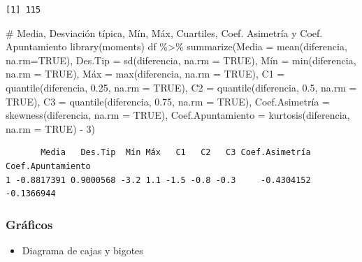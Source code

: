 \documentclass[
  spanish,
  a4paper,
]{scrreport}
\newenvironment{Shaded}{\begin{snugshade}}{\end{snugshade}}
\newcommand{\AttributeTok}[1]{\textcolor[rgb]{0.40,0.45,0.13}{#1}}
\newcommand{\CommentTok}[1]{\textcolor[rgb]{0.37,0.37,0.37}{#1}}
\newcommand{\ConstantTok}[1]{\textcolor[rgb]{0.56,0.35,0.01}{#1}}
\newcommand{\DecValTok}[1]{\textcolor[rgb]{0.68,0.00,0.00}{#1}}
\newcommand{\FloatTok}[1]{\textcolor[rgb]{0.68,0.00,0.00}{#1}}
\newcommand{\FunctionTok}[1]{\textcolor[rgb]{0.28,0.35,0.67}{#1}}
\newcommand{\NormalTok}[1]{\textcolor[rgb]{0.00,0.23,0.31}{#1}}
\newcommand{\OtherTok}[1]{\textcolor[rgb]{0.00,0.23,0.31}{#1}}
\newcommand{\SpecialCharTok}[1]{\textcolor[rgb]{0.37,0.37,0.37}{#1}}
\providecommand{\tightlist}{%
  \setlength{\itemsep}{0pt}\setlength{\parskip}{0pt}}
\theoremstyle{definition}
\theoremstyle{definition}
\theoremstyle{remark}
\begin{document}
\begin{verbatim}
[1] 115
\end{verbatim}

\begin{Shaded}
\begin{Highlighting}[]
\CommentTok{\# Media, Desviación típica, Mín, Máx, Cuartiles, Coef. Asimetría y Coef. Apuntamiento}
\FunctionTok{library}\NormalTok{(moments)}
\NormalTok{df }\SpecialCharTok{\%\textgreater{}\%} \FunctionTok{summarize}\NormalTok{(}\AttributeTok{Media =} \FunctionTok{mean}\NormalTok{(diferencia, }\AttributeTok{na.rm=}\ConstantTok{TRUE}\NormalTok{), }\AttributeTok{Des.Tip =} \FunctionTok{sd}\NormalTok{(diferencia, }\AttributeTok{na.rm =} \ConstantTok{TRUE}\NormalTok{), Mín }\OtherTok{=} \FunctionTok{min}\NormalTok{(diferencia, }\AttributeTok{na.rm =} \ConstantTok{TRUE}\NormalTok{), Máx }\OtherTok{=} \FunctionTok{max}\NormalTok{(diferencia, }\AttributeTok{na.rm =} \ConstantTok{TRUE}\NormalTok{), }\AttributeTok{C1 =} \FunctionTok{quantile}\NormalTok{(diferencia, }\FloatTok{0.25}\NormalTok{, }\AttributeTok{na.rm =} \ConstantTok{TRUE}\NormalTok{), }\AttributeTok{C2 =} \FunctionTok{quantile}\NormalTok{(diferencia, }\FloatTok{0.5}\NormalTok{, }\AttributeTok{na.rm =} \ConstantTok{TRUE}\NormalTok{), }\AttributeTok{C3 =} \FunctionTok{quantile}\NormalTok{(diferencia, }\FloatTok{0.75}\NormalTok{, }\AttributeTok{na.rm =} \ConstantTok{TRUE}\NormalTok{), Coef.Asimetría }\OtherTok{=} \FunctionTok{skewness}\NormalTok{(diferencia, }\AttributeTok{na.rm =} \ConstantTok{TRUE}\NormalTok{), }\AttributeTok{Coef.Apuntamiento =} \FunctionTok{kurtosis}\NormalTok{(diferencia, }\AttributeTok{na.rm =} \ConstantTok{TRUE}\NormalTok{) }\SpecialCharTok{{-}} \DecValTok{3}\NormalTok{)}
\end{Highlighting}
\end{Shaded}

\begin{verbatim}
       Media   Des.Tip  Mín Máx   C1   C2   C3 Coef.Asimetría Coef.Apuntamiento
1 -0.8817391 0.9000568 -3.2 1.1 -1.5 -0.8 -0.3     -0.4304152        -0.1366944
\end{verbatim}

\subsubsection{Gráficos}\label{gruxe1ficos-3}

\begin{itemize}
\tightlist
\item
  Diagrama de cajas y bigotes
\end{itemize}
\end{document}
